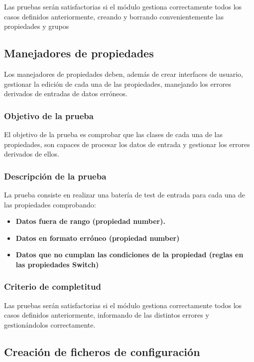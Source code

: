 Las pruebas serán satisfactorias si el módulo gestiona correctamente todos los casos definidos anteriormente, creando y borrando convenientemente las propiedades y grupos


\bigskip
\subsection{Manejadores de propiedades}

Los manejadores de propiedades deben, además de crear interfaces de usuario, gestionar la edición de cada una de las propiedades, manejando los errores derivados de entradas de datos erróneos.

\subsubsection{Objetivo de la prueba}

El objetivo de la prueba es comprobar que las clases de cada una de las propiedades, son capaces de procesar los datos de entrada y gestionar los errores derivados de ellos.

\subsubsection{Descripción de la prueba}

La prueba consiste en realizar una batería de test de entrada para cada una de las propiedades comprobando:

\begin{itemize}
  \item \textbf{Datos fuera de rango (propiedad number).}
  \item \textbf{Datos en formato erróneo (propiedad number)}
  \item \textbf{Datos que no cumplan las condiciones de la propiedad (reglas en las propiedades Switch)}  
\end{itemize}

\subsubsection{Criterio de completitud}

Las pruebas serán satisfactorias si el módulo gestiona correctamente todos los casos definidos anteriormente, informando de las distintos errores y gestionándolos correctamente.

\bigskip
\subsection{Creación de ficheros de configuración}

